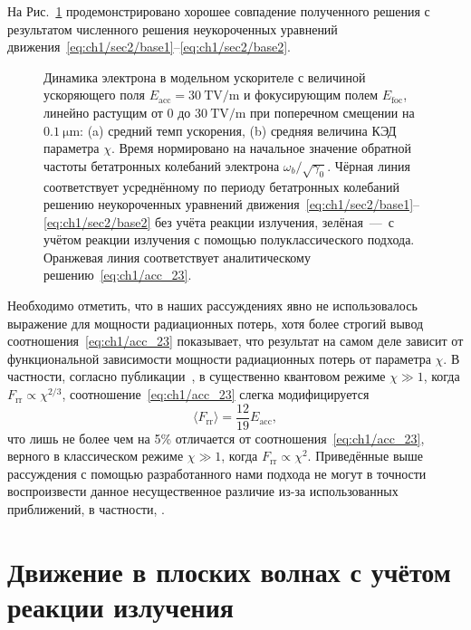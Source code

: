 На Рис.~\ref{fig:ch1/accelerator} продемонстрировано хорошее совпадение полученного решения с результатом численного решения неукороченных уравнений движения~\eqref{eq:ch1/sec2/base1}--\eqref{eq:ch1/sec2/base2}.
\begin{figure}[ht]
    \caption[Динамика электрона в модельном ускорителе]{Динамика электрона в модельном ускорителе с величиной ускоряющего поля $E_\mathrm{acc} = \SI{30}{\tera\volt/\meter}$ и фокусирующим полем $E_\mathrm{foc}$, линейно растущим от 0 до $\SI{30}{\tera\volt/\meter}$ при поперечном смещении на $\SI{0.1}{\um}$: (a) средний темп ускорения, (b) средняя величина КЭД параметра $\chi$. Время нормировано на начальное значение обратной частоты бетатронных колебаний электрона $\omega_b/\sqrt{\gamma_0}$. Чёрная линия соответствует усреднённому по периоду бетатронных колебаний решению неукороченных уравнений движения~\eqref{eq:ch1/sec2/base1}--\eqref{eq:ch1/sec2/base2} без учёта реакции излучения, зелёная~---~с учётом реакции излучения с помощью полуклассического подхода. Оранжевая линия соответствует аналитическому решению~\eqref{eq:ch1/acc_23}.}
    \label{fig:ch1/accelerator}
\end{figure}
Необходимо отметить, что в наших рассуждениях явно не использовалось выражение для мощности радиационных потерь, хотя более строгий вывод соотношения~\eqref{eq:ch1/acc_23} показывает, что результат на самом деле зависит от функциональной зависимости мощности радиационных потерь от параметра $\chi$.
В частности, согласно публикации~\cite{golovanov2021radiation}, в существенно квантовом режиме $\chi \gg 1$, когда $F_\mathrm{rr}\propto \chi^{2/3}$, соотношение~\eqref{eq:ch1/acc_23} слегка модифицируется
\begin{equation}
    \langle F_\mathrm{rr} \rangle = \frac{12}{19} E_\mathrm{acc} ,
\end{equation}
что лишь не более чем на 5\% отличается от соотношения~\eqref{eq:ch1/acc_23}, верного в классическом режиме $\chi \gg 1$, когда $F_\mathrm{rr}\propto \chi^{2}$.
Приведённые выше рассуждения с помощью разработанного нами подхода не могут в точности воспроизвести данное несущественное различие из-за использованных приближений, в частности, .

\section{Движение в плоских волнах с учётом реакции излучения}
\label{sub:ch1/sec5/EcrossB}

